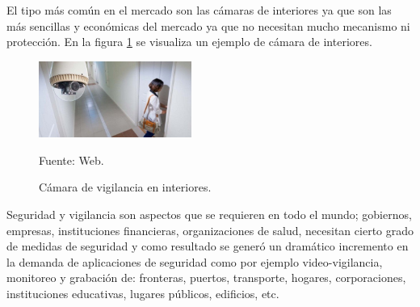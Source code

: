 El tipo más común en el mercado son las cámaras de interiores ya que son las más sencillas y económicas del mercado ya que no necesitan mucho mecanismo ni protección. En la figura \ref{fig:camara} se visualiza un ejemplo de cámara de interiores.\\

\begin{figure}[H]
    \begin{center}
        \includegraphics[width=5cm]{img/capitulo_3/camara_de_interiores.jpg}
    \end{center}
    \begin{center}
        \caption{Cámara de vigilancia en interiores.}
        Fuente: Web.
        \label{fig:camara}
    \end{center}
\end{figure}

Seguridad y vigilancia son aspectos que se requieren en todo el mundo; gobiernos, empresas, instituciones financieras, organizaciones de salud, necesitan cierto grado de medidas de seguridad y como resultado se generó un dramático incremento en la demanda de aplicaciones de seguridad como por ejemplo video-vigilancia, monitoreo y grabación de: fronteras, puertos, transporte, hogares, corporaciones, instituciones educativas, lugares públicos, edificios, etc.\\



